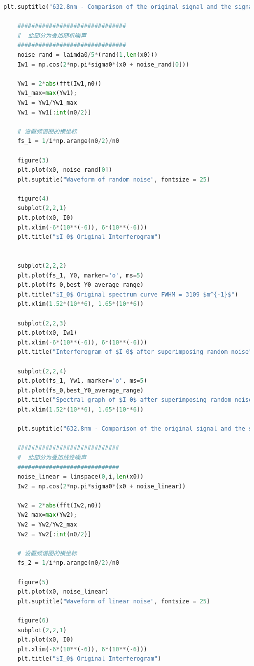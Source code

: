 \documentclass[conference]{IEEEtran}
\begin{document}
\begin{lstlisting}[language=python]
    plt.suptitle("632.8nm - Comparison of the original signal and the signal after adding sinusoidal noise", fontsize = 20)
    
    ###############################
    #  此部分为叠加随机噪声
    ###############################
    noise_rand = laimda0/5*(rand(1,len(x0)))
    Iw1 = np.cos(2*np.pi*sigma0*(x0 + noise_rand[0]))
    
    Yw1 = 2*abs(fft(Iw1,n0))
    Yw1_max=max(Yw1);
    Yw1 = Yw1/Yw1_max
    Yw1 = Yw1[:int(n0/2)]
    
    # 设置频谱图的横坐标
    fs_1 = 1/i*np.arange(n0/2)/n0
    
    figure(3)
    plt.plot(x0, noise_rand[0])
    plt.suptitle("Waveform of random noise", fontsize = 25)
    
    figure(4)
    subplot(2,2,1)
    plt.plot(x0, I0)
    plt.xlim(-6*(10**(-6)), 6*(10**(-6)))
    plt.title("$I_0$ Original Interferogram")
    
    
    subplot(2,2,2)
    plt.plot(fs_1, Y0, marker='o', ms=5)
    plt.plot(fs_0,best_Y0_average_range)
    plt.title("$I_0$ Original spectrum curve FWHM = 3109 $m^{-1}$")
    plt.xlim(1.52*(10**6), 1.65*(10**6))
    
    subplot(2,2,3)
    plt.plot(x0, Iw1)
    plt.xlim(-6*(10**(-6)), 6*(10**(-6)))
    plt.title("Interferogram of $I_0$ after superimposing random noise")
    
    subplot(2,2,4)
    plt.plot(fs_1, Yw1, marker='o', ms=5)
    plt.plot(fs_0,best_Y0_average_range)
    plt.title("Spectral graph of $I_0$ after superimposing random noise FWHM = 3103 $m^{-1}$")
    plt.xlim(1.52*(10**6), 1.65*(10**6))
    
    plt.suptitle("632.8nm - Comparison of the original signal and the signal after adding random noise", fontsize = 20)
    
    #############################
    #  此部分为叠加线性噪声
    #############################
    noise_linear = linspace(0,i,len(x0))
    Iw2 = np.cos(2*np.pi*sigma0*(x0 + noise_linear))
    
    Yw2 = 2*abs(fft(Iw2,n0))
    Yw2_max=max(Yw2);
    Yw2 = Yw2/Yw2_max
    Yw2 = Yw2[:int(n0/2)]
    
    # 设置频谱图的横坐标
    fs_2 = 1/i*np.arange(n0/2)/n0
    
    figure(5)
    plt.plot(x0, noise_linear)
    plt.suptitle("Waveform of linear noise", fontsize = 25)
    
    figure(6)
    subplot(2,2,1)
    plt.plot(x0, I0)
    plt.xlim(-6*(10**(-6)), 6*(10**(-6)))
    plt.title("$I_0$ Original Interferogram")
    

\end{lstlisting}
\end{document}
